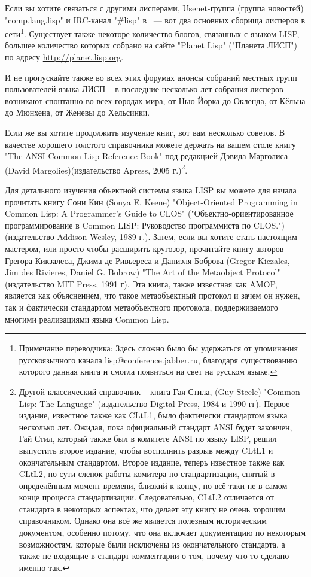 Если вы хотите связаться с другими лисперами, Usenet-группа (группа новостей)
"comp.lang.lisp" и IRC-канал "\#lisp" в ~--- вот два основных сборища лисперов в сети\footnote{Примечание переводчика:
  Здесь сложно было бы удержаться от упоминания русскоязычного канала
  lisp@conference.jabber.ru, благодаря существованию которого данная книга и смогла
  появиться на свет на русском языке.}. Существует также некоторе количество блогов,
связанных с языком LISP, большее количество которых собрано на сайте "Planet Lisp"
("Планета ЛИСП") по адресу \url{http://planet.lisp.org}.

И не пропускайте также во всех этих форумах анонсы собраний местных групп пользователей
языка ЛИСП -- в последние несколько лет собрания лисперов возникают спонтанно во всех
городах мира, от Нью-Йорка до Окленда, от Кёльна до Мюнхена, от Женевы до Хельсинки.

Если же вы хотите продолжить изучение книг, вот вам несколько советов. В качестве хорошего
толстого справочника можете держать на вашем столе книгу "The ANSI Common Lisp Reference
Book" под редакцией Дэвида Марголиса (David Margolies)(издательство Apress, 2005
г.)\footnote{Другой классический справочник -- книга Гая Стила, (Guy Steele) "Common Lisp:
  The Language" (издательство Digital Press, 1984 и 1990 гг). Первое издание, известное
  также как CLtL1, было фактически стандартом языка несколько лет. Ожидая, пока
  официальный стандарт ANSI будет закончен, Гай Стил, который также был в комитете ANSI по
  языку LISP, решил выпустить второе издание, чтобы восполнить разрыв между CLtL1 и
  окончательным стандартом. Второе издание, теперь известное также как CLtL2, по сути
  слепок работы комитера по стандартизации, снятый в определённым момент времени, близкий
  к концу, но всё-таки не в самом конце процесса стандартизации. Следовательно, CLtL2
  отличается от стандарта в некоторых аспектах, что делает эту книгу не очень хорошим
  справочником. Однако она всё же является полезным историческим документом, особенно
  потому, что она включает документацию по некоторым возможностям, которые были исключены
  из окончательного стандарта, а также не входящие в стандарт комментарии о том, почему
  что-то сделано именно так.}.

Для детального изучения объектной системы языка LISP вы можете для начала прочитать книгу
Сони Кин (Sonya E. Keene) "Object-Oriented Programming in Common Lisp: A Programmer's
Guide to CLOS" ("Объектно-ориентированное программирование в Common LISP: Руководство
программиста по CLOS.") (издательство Addison-Wesley, 1989 г.). Затем, если вы хотите
стать настоящим мастером, или просто чтобы расширить кругозор, прочитайте книгу авторов
Грегора Кикзалеса, Джима де Ривьереса и Даниэля Боброва (Gregor Kiczales, Jim des
Rivieres, Daniel G. Bobrow) "The Art of the Metaobject Protocol" (издательство MIT Press,
1991 г). Эта книга, также известная как AMOP, является как объяснением, что такое
метаобъектный протокол и зачем он нужен, так и фактически стандартом метаобъектного
протокола, поддерживаемого многими реализациями языка Common Lisp.

